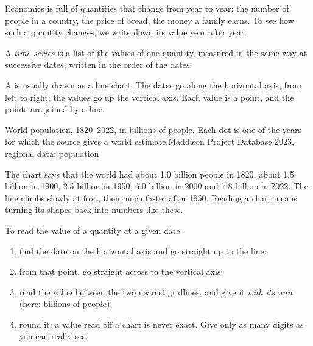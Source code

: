 Economics is full of quantities that change from year to year: the number of
people in a country, the price of bread, the money a family earns. To see how
such a quantity changes, we write down its value year after year.

\begin{definition}\label{def:g6:reading-economic-charts:time-series}
A \emph{time series} is a list of the values of one
quantity, measured in the same way at successive dates, written in the order
of the dates.
\end{definition}

A  is usually drawn as a line chart. The dates go along the
horizontal axis, from left to right; the values go up the vertical axis. Each
value is a point, and the points are joined by a line.

\begin{omchart}{World population, 1820--2022, in billions of people. Each dot
is one of the years for which the source gives a world estimate.}{Maddison Project Database 2023, regional data: population}
\end{omchart}

The chart says that the world had about 1.0 billion people in 1820, about
1.5 billion in 1900, 2.5 billion in 1950, 6.0 billion in 2000 and 7.8 billion
in 2022. The line climbs slowly at first, then much faster after 1950. Reading a
chart means turning its shapes back into numbers like these.

\begin{method}\label{met:g6:reading-economic-charts:read-value}
To read the value of a quantity at a given date:
\begin{enumerate}
  \item find the date on the horizontal axis and go straight up to the line;
  \item from that point, go straight across to the vertical axis;
  \item read the value between the two nearest gridlines, and give it
        \emph{with its unit} (here: billions of people);
  \item round it: a value read off a chart is never exact. Give only as many
        digits as you can really see.
\end{enumerate}
\end{method}

